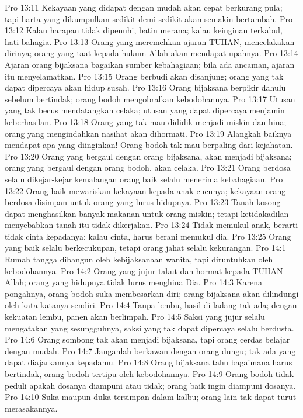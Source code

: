 Pro 13:11  Kekayaan yang didapat dengan mudah akan cepat berkurang pula; tapi harta yang dikumpulkan sedikit demi sedikit akan semakin bertambah.
Pro 13:12  Kalau harapan tidak dipenuhi, batin merana; kalau keinginan terkabul, hati bahagia.
Pro 13:13  Orang yang meremehkan ajaran TUHAN, mencelakakan dirinya; orang yang taat kepada hukum Allah akan mendapat upahnya.
Pro 13:14  Ajaran orang bijaksana bagaikan sumber kebahagiaan; bila ada ancaman, ajaran itu menyelamatkan.
Pro 13:15  Orang berbudi akan disanjung; orang yang tak dapat dipercaya akan hidup susah.
Pro 13:16  Orang bijaksana berpikir dahulu sebelum bertindak; orang bodoh mengobralkan kebodohannya.
Pro 13:17  Utusan yang tak becus mendatangkan celaka; utusan yang dapat dipercaya menjamin keberhasilan.
Pro 13:18  Orang yang tak mau dididik menjadi miskin dan hina; orang yang mengindahkan nasihat akan dihormati.
Pro 13:19  Alangkah baiknya mendapat apa yang diinginkan! Orang bodoh tak mau berpaling dari kejahatan.
Pro 13:20  Orang yang bergaul dengan orang bijaksana, akan menjadi bijaksana; orang yang bergaul dengan orang bodoh, akan celaka.
Pro 13:21  Orang berdosa selalu dikejar-kejar kemalangan orang baik selalu menerima kebahagiaan.
Pro 13:22  Orang baik mewariskan kekayaan kepada anak cucunya; kekayaan orang berdosa disimpan untuk orang yang lurus hidupnya.
Pro 13:23  Tanah kosong dapat menghasilkan banyak makanan untuk orang miskin; tetapi ketidakadilan menyebabkan tanah itu tidak dikerjakan.
Pro 13:24  Tidak memukul anak, berarti tidak cinta kepadanya; kalau cinta, harus berani memukul dia.
Pro 13:25  Orang yang baik selalu berkecukupan, tetapi orang jahat selalu kekurangan.
Pro 14:1  Rumah tangga dibangun oleh kebijaksanaan wanita, tapi diruntuhkan oleh kebodohannya.
Pro 14:2  Orang yang jujur takut dan hormat kepada TUHAN Allah; orang yang hidupnya tidak lurus menghina Dia.
Pro 14:3  Karena pongahnya, orang bodoh suka membesarkan diri; orang bijaksana akan dilindungi oleh kata-katanya sendiri.
Pro 14:4  Tanpa lembu, hasil di ladang tak ada; dengan kekuatan lembu, panen akan berlimpah.
Pro 14:5  Saksi yang jujur selalu mengatakan yang sesungguhnya, saksi yang tak dapat dipercaya selalu berdusta.
Pro 14:6  Orang sombong tak akan menjadi bijaksana, tapi orang cerdas belajar dengan mudah.
Pro 14:7  Janganlah berkawan dengan orang dungu; tak ada yang dapat diajarkannya kepadamu.
Pro 14:8  Orang bijaksana tahu bagaimana harus bertindak, orang bodoh tertipu oleh kebodohannya.
Pro 14:9  Orang bodoh tidak peduli apakah dosanya diampuni atau tidak; orang baik ingin diampuni dosanya.
Pro 14:10  Suka maupun duka tersimpan dalam kalbu; orang lain tak dapat turut merasakannya.
